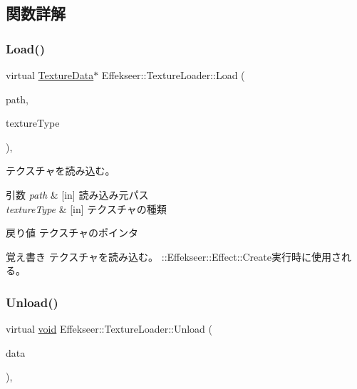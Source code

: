 \subsection{関数詳解}
\mbox{\label{class_effekseer_1_1_texture_loader_a91cc55233a4131d9994857dfe611460b}} 
\subsubsection{\texorpdfstring{Load()}{Load()}}
{\footnotesize\ttfamily virtual \mbox{\hyperlink{struct_effekseer_1_1_texture_data}{Texture\+Data}}$\ast$ Effekseer\+::\+Texture\+Loader\+::\+Load (\begin{DoxyParamCaption}\item[{const \mbox{\hyperlink{_effekseer_8h_a50b026abea014b47854bcd835b3b6233}{E\+F\+K\+\_\+\+C\+H\+AR}} $\ast$}]{path,  }\item[{\mbox{\hyperlink{namespace_effekseer_a781925ba462884c4ef87fd38ffdedba4}{Texture\+Type}}}]{texture\+Type }\end{DoxyParamCaption})\hspace{0.3cm}{\ttfamily [inline]}, {\ttfamily [virtual]}}



テクスチャを読み込む。 


\begin{DoxyParams}{引数}
{\em path} & \mbox{[}in\mbox{]} 読み込み元パス \\
\hline
{\em texture\+Type} & \mbox{[}in\mbox{]} テクスチャの種類 \\
\hline
\end{DoxyParams}
\begin{DoxyReturn}{戻り値}
テクスチャのポインタ 
\end{DoxyReturn}
\begin{DoxyNote}{覚え書き}
テクスチャを読み込む。 \+::\+Effekseer\+::\+Effect\+::\+Create実行時に使用される。 
\end{DoxyNote}
\mbox{\label{class_effekseer_1_1_texture_loader_a128fdd6e613758012fb9ceaf2881adb7}} 
\subsubsection{\texorpdfstring{Unload()}{Unload()}}
{\footnotesize\ttfamily virtual \mbox{\hyperlink{namespace_effekseer_ab34c4088e512200cf4c2716f168deb56}{void}} Effekseer\+::\+Texture\+Loader\+::\+Unload (\begin{DoxyParamCaption}\item[{\mbox{\hyperlink{struct_effekseer_1_1_texture_data}{Texture\+Data}} $\ast$}]{data }\end{DoxyParamCaption})\hspace{0.3cm}{\ttfamily [inline]}, {\ttfamily [virtual]}}



